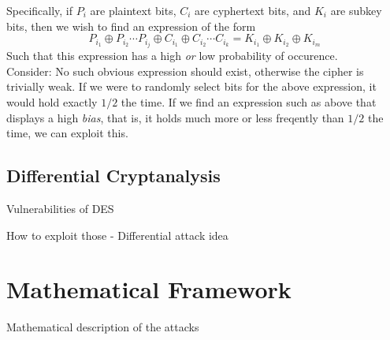 \documentclass[9pt]{beamer}
\begin{document}
\begin{frame}
Specifically, if $P_{i}$ are plaintext bits, $C_{i}$ are cyphertext bits, and $K_{i}$ are subkey bits, then we wish to find an expression of the form
\[ P_{i_1} \oplus P_{i_2} \cdots P_{i_j} \oplus C_{i_1} \oplus C_{i_2} \cdots C_{i_k} = K_{i_1} \oplus K_{i_2} \oplus K_{i_m} \]
Such that this expression has a high \textit{or} low probability of occurence.\\
\vspace{5mm}
Consider: No such obvious expression should exist, otherwise the cipher is trivially weak. If we were to randomly select bits for the above expression, it would hold exactly $1/2$ the time. If we find an expression such as above that displays a high \textit{bias}, that is, it holds much more or less freqently than $1/2$ the time, we can exploit this.
\end{frame}


\subsection{Differential Cryptanalysis}
\begin{frame}
Vulnerabilities of DES

\end{frame}

\begin{frame}
How to exploit those - Differential attack idea

\end{frame}

\section{Mathematical Framework}
\begin{frame}
Mathematical description of the attacks

\end{frame}
\end{document}
